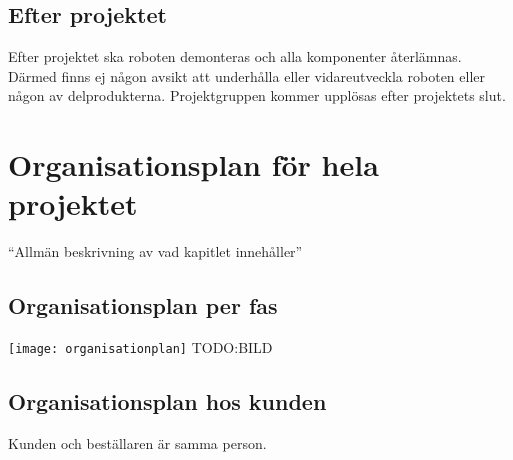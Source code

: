 \documentclass{article}
\begin{document}
\subsection{Efter projektet}
Efter projektet ska roboten demonteras och alla komponenter återlämnas. Därmed finns ej någon avsikt att underhålla eller vidareutveckla roboten eller någon av delprodukterna. Projektgruppen kommer upplösas efter projektets slut.

\section{Organisationsplan för hela projektet}
``Allmän beskrivning av vad kapitlet innehåller''
\subsection{Organisationsplan per fas}

\texttt{[image: organisationplan]}
TODO:BILD

\subsection{Organisationsplan hos kunden}
Kunden och beställaren är samma person.
\end{document}
